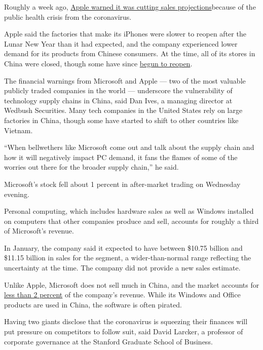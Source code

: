 Roughly a week ago,
\href{https://www.nytimes.com/2020/02/17/technology/apple-coronavirus-economy.html}{Apple
warned it was cutting sales projections}because of the public health
crisis from the coronavirus.

Apple said the factories that make its iPhones were slower to reopen
after the Lunar New Year than it had expected, and the company
experienced lower demand for its products from Chinese consumers. At the
time, all of its stores in China were closed, though some have since
\href{https://www.bloomberg.com/news/articles/2020-02-24/apple-reopens-more-than-half-of-its-retail-stores-in-china}{begun
to reopen}.

The financial warnings from Microsoft and Apple --- two of the most
valuable publicly traded companies in the world --- underscore the
vulnerability of technology supply chains in China, said Dan Ives, a
managing director at Wedbush Securities. Many tech companies in the
United States rely on large factories in China, though some have started
to shift to other countries like Vietnam.

``When bellwethers like Microsoft come out and talk about the supply
chain and how it will negatively impact PC demand, it fans the flames of
some of the worries out there for the broader supply chain,'' he said.

Microsoft's stock fell about 1 percent in after-market trading on
Wednesday evening.

Personal computing, which includes hardware sales as well as Windows
installed on computers that other companies produce and sell, accounts
for roughly a third of Microsoft's revenue.

In January, the company said it expected to have between \$10.75 billion
and \$11.15 billion in sales for the segment, a wider-than-normal range
reflecting the uncertainty at the time. The company did not provide a
new sales estimate.

Unlike Apple, Microsoft does not sell much in China, and the market
accounts for
\href{https://www.geekwire.com/2020/microsoft-president-brad-smith-tech-cold-war-u-s-china-relations/}{less
than 2 percent} of the company's revenue. While its Windows and Office
products are used in China, the software is often pirated.

Having two giants disclose that the coronavirus is squeezing their
finances will put pressure on competitors to follow suit, said David
Larcker, a professor of corporate governance at the Stanford Graduate
School of Business.

